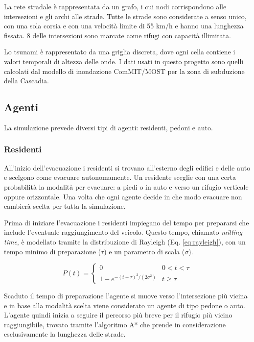 La rete stradale è rappresentata da un grafo, i cui nodi corrispondono alle intersezioni e gli archi alle strade.
Tutte le strade sono considerate a senso unico, con una sola corsia e con una velocità limite di 55 km/h e hanno una lunghezza fissata.
8 delle intersezioni sono marcate come rifugi con capacità illimitata.

Lo tsunami è rappresentato da una griglia discreta, dove ogni cella contiene i valori temporali di altezza delle onde.
I dati usati in questo progetto sono quelli calcolati dal modello di inondazione ComMIT/MOST \parencite{titov1997implementation} per la zona di subduzione della Cascadia.

\pagebreak

\subsection{Agenti}
La simulazione prevede diversi tipi di agenti: residenti, pedoni e auto.

\subsubsection{Residenti}
All'inizio dell'evacuazione i residenti si trovano all'esterno degli edifici e delle auto
e scelgono come evacuare autonomamente.
Un residente sceglie con una certa probabilità la modalità per evacuare: a piedi o in auto e verso un rifugio verticale oppure orizzontale.
Una volta che ogni agente decide in che modo evacuare non cambierà scelta per tutta la simulazione.

Prima di iniziare l'evacuazione i residenti impiegano del tempo per prepararsi
che include l'eventuale raggiungimento del veicolo.
%
Questo tempo, chiamato \textit{milling time}, è modellato tramite
la distribuzione di Rayleigh (Eq. \ref{eq:rayleigh}), con un tempo minimo di preparazione ($\tau$) e un parametro di scala ($\sigma$).

\begin{equation}
  P(t) = 
  \begin{cases}
    0 &0 < t < \tau\\
    1 - e^{-{(t - \tau)^2}/(2\sigma^2)} &t \geq \tau
  \end{cases}
  \label{eq:rayleigh}
\end{equation}

Scaduto il tempo di preparazione l'agente si muove verso l'intersezione più vicina e
in base alla modalità scelta viene considerato un agente di tipo pedone o auto.
L'agente quindi inizia a seguire il percorso più breve per il rifugio più vicino raggiungibile, trovato tramite l'algoritmo A* 
che prende in considerazione esclusivamente la lunghezza delle strade.

